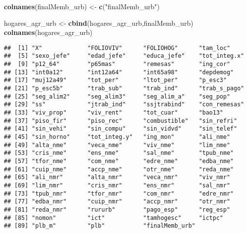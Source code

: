 \documentclass[11pt,]{article}
\newenvironment{Shaded}{\begin{snugshade}}{\end{snugshade}}
\newcommand{\KeywordTok}[1]{\textcolor[rgb]{0.13,0.29,0.53}{\textbf{#1}}}
\newcommand{\DecValTok}[1]{\textcolor[rgb]{0.00,0.00,0.81}{#1}}
\newcommand{\StringTok}[1]{\textcolor[rgb]{0.31,0.60,0.02}{#1}}
\newcommand{\OperatorTok}[1]{\textcolor[rgb]{0.81,0.36,0.00}{\textbf{#1}}}
\newcommand{\NormalTok}[1]{#1}
\begin{document}
\begin{Shaded}
\begin{Highlighting}[]
\KeywordTok{colnames}\NormalTok{(finalMemb_urb) <-}\StringTok{ }\KeywordTok{c}\NormalTok{(}\StringTok{"finalMemb_urb"}\NormalTok{) }

\NormalTok{hogares_agr_urb <-}\StringTok{ }\KeywordTok{cbind}\NormalTok{(hogares_agr_urb,finalMemb_urb)}
\KeywordTok{colnames}\NormalTok{(hogares_agr_urb)}
\end{Highlighting}
\end{Shaded}

\begin{verbatim}
##  [1] "X"             "FOLIOVIV"      "FOLIOHOG"      "tam_loc"      
##  [5] "sexo_jefe"     "edad_jefe"     "educa_jefe"    "tot_integ.x"  
##  [9] "p12_64"        "p65mas"        "remesas"       "ing_cor"      
## [13] "int0a12"       "int12a64"      "int65a98"      "depdemog"     
## [17] "muj12a49"      "tot_per"       "ltot_per"      "p_esc3"       
## [21] "p_esc5b"       "trab_sub"      "trab_ind"      "trab_s_pago"  
## [25] "seg_alim2"     "seg_alim3"     "seg_alim_a"    "seg_pop"      
## [29] "ss"            "jtrab_ind"     "ssjtrabind"    "con_remesas"  
## [33] "viv_prop"      "viv_rent"      "tot_cuar"      "bao13"        
## [37] "piso_fir"      "piso_rec"      "combustible"   "sin_refri"    
## [41] "sin_vehi"      "sin_compu"     "sin_vidvd"     "sin_telef"    
## [45] "sin_horno"     "tot_integ.y"   "ing_mon"       "ali_nme"      
## [49] "alta_nme"      "veca_nme"      "viv_nme"       "lim_nme"      
## [53] "cris_nme"      "ens_nme"       "sal_nme"       "tpub_nme"     
## [57] "tfor_nme"      "com_nme"       "edre_nme"      "edba_nme"     
## [61] "cuip_nme"      "accp_nme"      "otr_nme"       "reda_nme"     
## [65] "ali_nmr"       "alta_nmr"      "veca_nmr"      "viv_nmr"      
## [69] "lim_nmr"       "cris_nmr"      "ens_nmr"       "sal_nmr"      
## [73] "tpub_nmr"      "tfor_nmr"      "com_nmr"       "edre_nmr"     
## [77] "edba_nmr"      "cuip_nmr"      "accp_nmr"      "otr_nmr"      
## [81] "reda_nmr"      "rururb"        "pago_esp"      "reg_esp"      
## [85] "nomon"         "ict"           "tamhogesc"     "ictpc"        
## [89] "plb_m"         "plb"           "finalMemb_urb"
\end{verbatim}

\begin{Shaded}
\end{Shaded}
\end{document}
